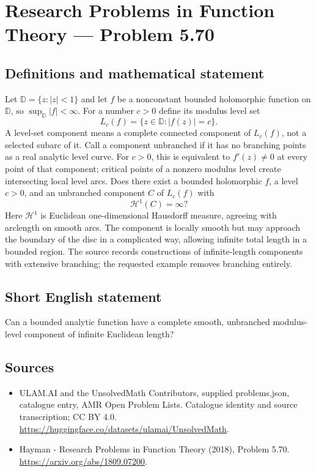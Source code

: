 \documentclass[11pt,a4paper]{article}
\begin{document}
\section*{Research Problems in Function Theory — Problem 5.70}\label{statement}

\subsection{Definitions and mathematical statement}
Let $\mathbb D=\{z:|z|<1\}$ and let $f$ be a nonconstant bounded holomorphic function on $\mathbb D$, so $\sup_{\mathbb D}|f|<\infty$. For a number $c>0$ define its modulus level set
\[
L_c(f)=\{z\in\mathbb D:|f(z)|=c\}.
\]
A level-set component means a complete connected component of $L_c(f)$, not a selected subarc of it. Call a component unbranched if it has no branching points as a real analytic level curve. For $c>0$, this is equivalent to $f'(z)\ne0$ at every point of that component; critical points of a nonzero modulus level create intersecting local level arcs.
Does there exist a bounded holomorphic $f$, a level $c>0$, and an unbranched component $C$ of $L_c(f)$ with
\[
\mathcal H^1(C)=\infty?
\]
Here $\mathcal H^1$ is Euclidean one-dimensional Hausdorff measure, agreeing with arclength on smooth arcs. The component is locally smooth but may approach the boundary of the disc in a complicated way, allowing infinite total length in a bounded region. The source records constructions of infinite-length components with extensive branching; the requested example removes branching entirely.
\subsection{Short English statement}
Can a bounded analytic function have a complete smooth, unbranched modulus-level component of infinite Euclidean length?
\subsection{Sources}
\begin{itemize}
\item[S1] ULAM.AI and the UnsolvedMath Contributors, supplied problems.json, catalogue entry, AMR Open Problem Lists. Catalogue identity and source transcription; CC BY 4.0.
\url{https://huggingface.co/datasets/ulamai/UnsolvedMath}.
\item[S2] Hayman - Research Problems in Function Theory (2018), Problem 5.70. 
\url{https://arxiv.org/abs/1809.07200}.
\end{itemize}
\end{document}
